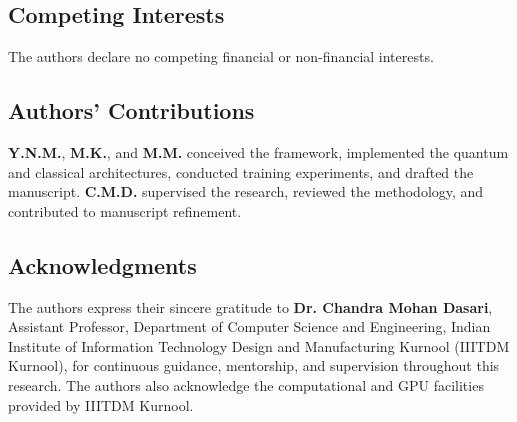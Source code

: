 \documentclass[10pt,twocolumn,a4paper]{article}
\begin{document}
\subsection*{Competing Interests}
The authors declare no competing financial or non-financial interests.

\subsection*{Authors' Contributions}
\textbf{Y.N.M.}, \textbf{M.K.}, and \textbf{M.M.} conceived the framework, implemented the quantum and classical architectures, conducted training experiments, and drafted the manuscript. \textbf{C.M.D.} supervised the research, reviewed the methodology, and contributed to manuscript refinement.

\subsection*{Acknowledgments}
The authors express their sincere gratitude to \textbf{Dr. Chandra Mohan Dasari}, Assistant Professor, Department of Computer Science and Engineering, Indian Institute of Information Technology Design and Manufacturing Kurnool (IIITDM Kurnool), for continuous guidance, mentorship, and supervision throughout this research. The authors also acknowledge the computational and GPU facilities provided by IIITDM Kurnool.
\end{document}
